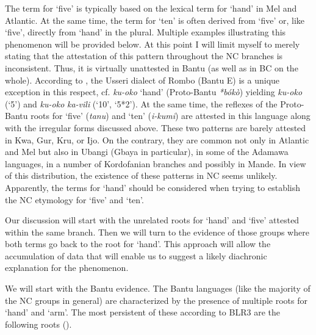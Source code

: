 The term for ‘five’ is typically based on the lexical term for ‘hand’ in Mel and Atlantic. At the same time, the term for ‘ten’ is often derived from ‘five’ or, like ‘five’, directly from ‘hand’ in the plural. Multiple examples illustrating this phenomenon will be provided below. At this point I will limit myself to merely stating that the attestation of this pattern throughout the NC branches is inconsistent. Thus, it is virtually unattested in Bantu (as well as in BC on the whole). According to \citealt{NursePhilippson1975}, the Usseri dialect of Rombo (Bantu E) is a unique exception in this respect, cf. \textit{ku-oko} ‘hand’ (Proto-Bantu \textit{*bókò}) yielding \textit{ku-oko} (‘5’) and \textit{ku-oko} \textit{ka-vili} (‘10’, ‘5*2’). At the same time, the reflexes of the Proto-Bantu roots for ‘five’ (\textit{tanu}) and ‘ten’ (\textit{i-kumi}) are attested in this language along with the irregular forms discussed above. These two patterns are barely attested in Kwa, Gur, Kru, or Ijo. On the contrary, they are common not only in Atlantic and Mel but also in Ubangi (Gbaya in particular), in some of the Adamawa languages, in a number of Kordofanian branches and possibly in Mande. In view of this distribution, the existence of these patterns in NC seems unlikely. Apparently, the terms for ‘hand’ should be considered when trying to establish the NC etymology for ‘five’ and ‘ten’.

Our discussion will start with the unrelated roots for ‘hand’ and ‘five’ attested within the same branch. Then we will turn to the evidence of those groups where both terms go back to the root for ‘hand’. This approach will allow the accumulation of data that will enable us to suggest a likely diachronic explanation for the phenomenon. 

We will start with the Bantu evidence. The Bantu languages (like the majority of the NC groups in general) are characterized by the presence of multiple roots for ‘hand’ and ‘arm’. The most persistent of these according to BLR3 are the following roots ().

